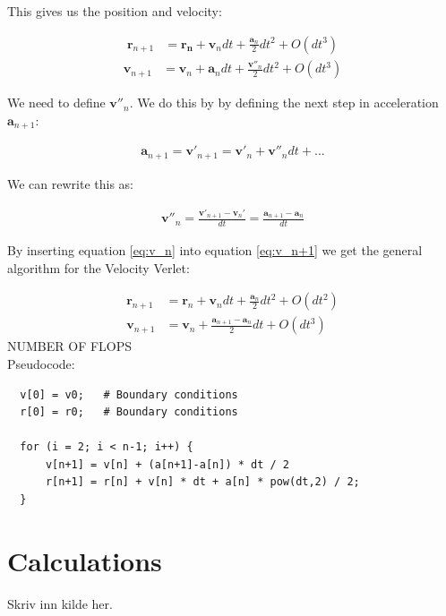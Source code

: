 \documentclass{article}
\begin{document}
This gives us the position and velocity:

\begin{align}
    \mathbf{r}_{n+1}&=\mathbf{r_n}+\mathbf{v}_n dt + \frac{\mathbf{a}_n}{2}dt^2+O(dt^3)
    \label{eq:r_n+1}
    \end{align}
    \begin{align}
    \mathbf{v}_{n+1}&=\mathbf{v}_n+\mathbf{a}_ndt+\frac{\mathbf{v}''_n}{2}dt^2 + O(dt^3)
     \label{eq:v_n+1}
\end{align}

We need to define $\mathbf{v}''_n$. We do this by by defining the next step in acceleration $\mathbf{a}_{n+1}$:

\begin{align*}
    \mathbf{a}_{n+1}=\mathbf{v}'_{n+1}=\mathbf{v}'_n+\mathbf{v}''_ndt + ...
\end{align*}

We can rewrite this as:

\begin{align}
        \mathbf{v}''_n=\frac{\mathbf{v}'_{n+1}-\mathbf{v}_n'}{dt}
    =\frac{\mathbf{a}_{n+1}-\mathbf{a}_n}{dt}
    \label{eq:v_n}
\end{align}

By inserting equation \ref{eq:v_n} into equation \ref{eq:v_n+1} we get the general algorithm for the Velocity Verlet:

\begin{align*}
    \mathbf{r}_{n+1}&=\mathbf{r}_n+\mathbf{v}_ndt+\frac{\mathbf{a}_n}{2}dt^2+O(dt^2)\\
    \mathbf{v}_{n+1}&=\mathbf{v}_n+\frac{\mathbf{a}_{n+1}-\mathbf{a}_n}{2}dt+O(dt^3)
\end{align*}
NUMBER OF FLOPS
\\
Pseudocode:

\begin{verbatim}
  v[0] = v0;   # Boundary conditions
  r[0] = r0;   # Boundary conditions

  for (i = 2; i < n-1; i++) {
      v[n+1] = v[n] + (a[n+1]-a[n]) * dt / 2
      r[n+1] = r[n] + v[n] * dt + a[n] * pow(dt,2) / 2;
  }

\end{verbatim}

\section{Calculations} 

\begin{thebibliography}{9}
	Skriv inn kilde her.
\end{thebibliography}
\end{document}
